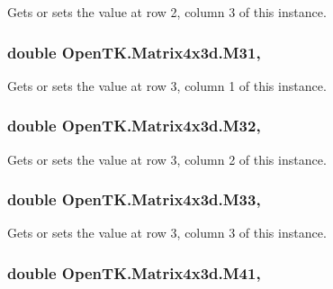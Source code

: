 Gets or sets the value at row 2, column 3 of this instance. 

\hypertarget{struct_open_t_k_1_1_matrix4x3d_a3dedc4248d817dcffaf98cf89b420ab2}{
\subsubsection[{M31}]{\setlength{\rightskip}{0pt plus 5cm}double Open\-T\-K.\-Matrix4x3d.\-M31\hspace{0.3cm}{\ttfamily [get]}, {\ttfamily [set]}}}\label{struct_open_t_k_1_1_matrix4x3d_a3dedc4248d817dcffaf98cf89b420ab2}


Gets or sets the value at row 3, column 1 of this instance. 

\hypertarget{struct_open_t_k_1_1_matrix4x3d_a6b6c8697fde21502ee283d149f271b13}{
\subsubsection[{M32}]{\setlength{\rightskip}{0pt plus 5cm}double Open\-T\-K.\-Matrix4x3d.\-M32\hspace{0.3cm}{\ttfamily [get]}, {\ttfamily [set]}}}\label{struct_open_t_k_1_1_matrix4x3d_a6b6c8697fde21502ee283d149f271b13}


Gets or sets the value at row 3, column 2 of this instance. 

\hypertarget{struct_open_t_k_1_1_matrix4x3d_a33afc463d9e3b788d1a900202e500147}{
\subsubsection[{M33}]{\setlength{\rightskip}{0pt plus 5cm}double Open\-T\-K.\-Matrix4x3d.\-M33\hspace{0.3cm}{\ttfamily [get]}, {\ttfamily [set]}}}\label{struct_open_t_k_1_1_matrix4x3d_a33afc463d9e3b788d1a900202e500147}


Gets or sets the value at row 3, column 3 of this instance. 

\hypertarget{struct_open_t_k_1_1_matrix4x3d_aa40c8a9d772a780b125c3ba19dc58070}{
\subsubsection[{M41}]{\setlength{\rightskip}{0pt plus 5cm}double Open\-T\-K.\-Matrix4x3d.\-M41\hspace{0.3cm}{\ttfamily [get]}, {\ttfamily [set]}}}\label{struct_open_t_k_1_1_matrix4x3d_aa40c8a9d772a780b125c3ba19dc58070}


